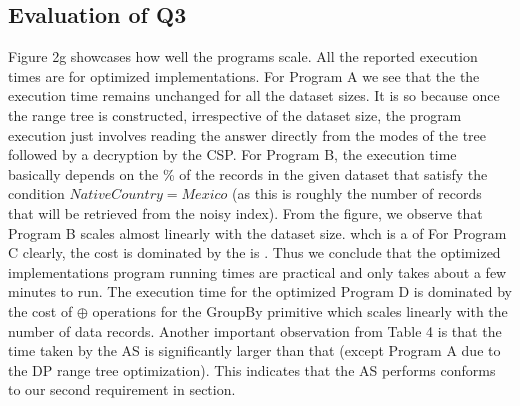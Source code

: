  \subsection{Evaluation of Q3}
 Figure 2g showcases how well the \system programs scale. All the reported execution times are for optimized implementations. For Program A we see that the the execution time remains unchanged for all the dataset sizes. It is so because once the range tree is constructed, irrespective of the dataset size, the program execution just involves reading the answer directly from the modes of the tree followed by a decryption by the \textsf{CSP}. For Program B, the execution time basically depends on the \% of the records in the given dataset that satisfy the condition $NativeCountry=Mexico$ (as this is roughly the number of records that will be retrieved from the noisy index). From the figure, we observe that Program B scales almost linearly with the dataset size. whch is a of 
 For Program C clearly, the cost is dominated by the  is . Thus we conclude that the optimized implementations \system program running times are practical and only takes about a few minutes to run. The execution time for the optimized Program D is dominated by the cost of $\oplus$ operations for the \textsf{GroupBy} primitive which scales linearly with the number of data records. Another important observation from Table 4 is that the time taken by the \textsf{AS} is significantly larger than that  (except Program A due to the DP range tree optimization). This indicates that the \textsf{AS} performs conforms to our second requirement in section. 
